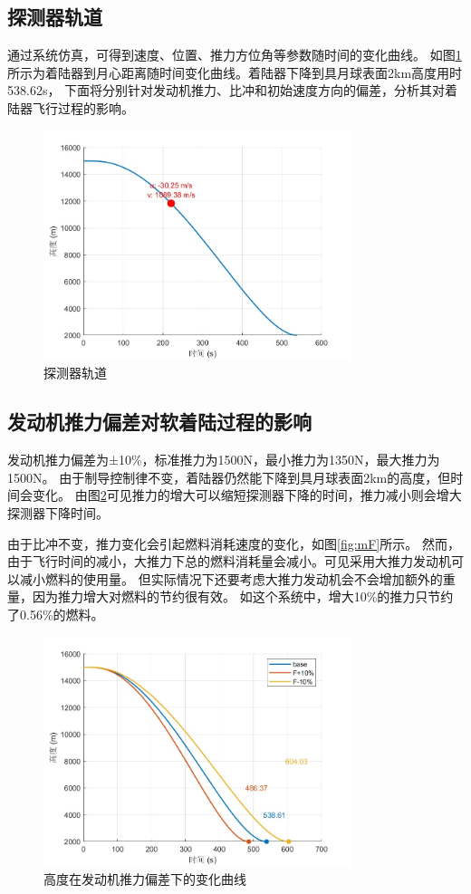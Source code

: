 \documentclass[12pt,a4paper]{article}
\begin{document}
\subsection{探测器轨道}
通过系统仿真，可得到速度、位置、推力方位角等参数随时间的变化曲线。
如图\ref{fig:orbit}所示为着陆器到月心距离随时间变化曲线。着陆器下降到具月球表面2km高度用时538.62s，
下面将分别针对发动机推力、比冲和初始速度方向的偏差，分析其对着陆器飞行过程的影响。
\begin{figure}[H]
\centering
\includegraphics[width=0.8\textwidth]{figures/detector.jpg}
\caption{探测器轨道}
\label{fig:orbit}
\end{figure}

\subsection{发动机推力偏差对软着陆过程的影响}
发动机推力偏差为±10\%，标准推力为1500N，最小推力为1350N，最大推力为1500N。
由于制导控制律不变，着陆器仍然能下降到具月球表面2km的高度，但时间会变化。
由图\ref{fig:altF}可见推力的增大可以缩短探测器下降的时间，推力减小则会增大探测器下降时间。

由于比冲不变，推力变化会引起燃料消耗速度的变化，如图\ref{fig:mF}所示。
然而，由于飞行时间的减小，大推力下总的燃料消耗量会减小。可见采用大推力发动机可以减小燃料的使用量。
但实际情况下还要考虑大推力发动机会不会增加额外的重量，因为推力增大对燃料的节约很有效。
如这个系统中，增大10\%的推力只节约了0.56\%的燃料。

\begin{figure}[H]
\centering
\includegraphics[width=0.8\textwidth]{figures/altitude_F.jpg}
\caption{高度在发动机推力偏差下的变化曲线}
\label{fig:altF}
\end{figure}
\end{document}
